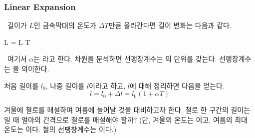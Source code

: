 \subsubsection{Linear Expansion}
%
\ 길이가 $L$인 금속막대의 온도가 $\Delta T$만큼 올라간다면 길이 변화는 다음과 같다.
\begin{eqbox} \Delta L = L \alpha \Delta T
\label{eq:linear_expansion} \end{eqbox}
\ 여기서 $\alpha$는 라고 한다.
차원을 분석하면 선팽창계수는 의 단위를 갖는다.
선팽창계수는 을 의미한다.
\begin{sssbox}
%
처음 길이를 $l_0$, 나중 길이를 $l$이라고 하고, $l$에 대해 정리하면 다음을 얻는다.
\begin{equation*} l = l_0 + \Delta l = l_0(1 + \alpha T) \end{equation*}
\end{sssbox}

\begin{checkbox*}
겨울에 철로를 매설하며 여름에 늘어날 것을 대비하고자 한다.
철로 한 구간의 길이는 일 때 얼마의 간격으로 철로를 매설해야 할까?
(단, 겨울의 온도는 이고,
여름의 최대 온도는 이다.
철의 선팽창계수는 이다.)
\end{checkbox*}

